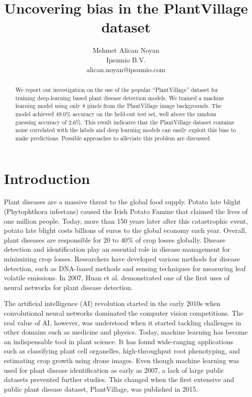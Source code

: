 \documentclass{article}
\title{Uncovering bias in the PlantVillage dataset}
\author{Mehmet Alican Noyan\\
        \small{Ipsumio B.V.}\\
        \small{alican.noyan@ipsumio.com} \\}
\begin{document}
\maketitle

\begin{abstract}
We report our investigation on the use of the popular “PlantVillage” dataset for training deep-learning based plant disease detection models. We trained a machine learning model using only 8 pixels from the PlantVillage image backgrounds. The model achieved 49.0\% accuracy on the held-out test set, well above the random guessing accuracy of 2.6\%. This result indicates that the PlantVillage dataset contains noise correlated with the labels and deep learning models can easily exploit this bias to make predictions. Possible approaches to alleviate this problem are discussed.
\end{abstract}

\section{Introduction}

Plant diseases are a massive threat to the global food supply. Potato late blight (Phytophthora infestans) caused the Irish Potato Famine that claimed the lives of one million people. Today, more than 150 years later after this catastrophic event, potato late blight costs billions of euros to the global economy each year\cite{Haverkort2008}. Overall, plant diseases are responsible for 20 to 40\% of crop losses globally\cite{Savary2019, Oerke2006}. Disease detection and identification play an essential role in disease management for minimizing crop losses. Researchers have developed various methods for disease detection, such as DNA-based methods and sensing techniques for measuring leaf volatile emissions\cite{Martinelli2015, Li2019}. In 2007, Huan et al. demonstrated one of the first uses of neural networks for plant disease detection\cite{Huang2007}.

The artificial intelligence (AI) revolution started in the early 2010s when convolutional neural networks dominated the computer vision competitions\cite{Ciregan2012, Krizhevsky2012}. The real value of AI, however, was understood when it started tackling challenges in other domains such as medicine\cite{Noyan2020} and physics\cite{Hussain2020}. Today, machine learning has become an indispensable tool in plant science. It has found wide-ranging applications such as classifying plant cell organelles\cite{Li2021}, high-throughput root phenotyping\cite{Lube2022}, and estimating crop growth using drone images\cite{Han2019}. Even though machine learning was used for plant disease identification as early as 2007, a lack of large public datasets prevented further studies. This changed when the first extensive and public plant disease dataset, PlantVillage, was published in 2015\cite{Hughes2015}.
\end{document}
